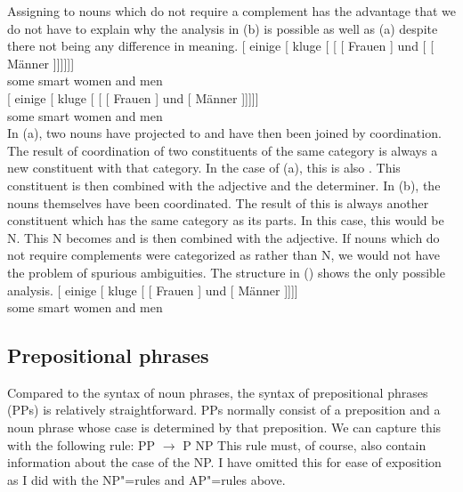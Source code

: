 Assigning \nbar to nouns which do not require a complement has the advantage that we do not have to explain why the analysis in (b) is possible as well
as (a) despite there not being any difference in meaning.
\eal
\ex 
\gll {}[ einige [\sub{\nbar} kluge [\sub{\nbar} [\sub{\nbar} [ Frauen ] und  [\sub{\nbar} [ Männer ]]]]]]\\
	 {}      some   {}           smart {}          {}           {}       women  {} and {} {}          men\\
\ex 
\gll {}[ einige [\sub{\nbar} kluge [\sub{\nbar} [ [ Frauen ] und [ Männer
]]]]]\\
	{}       some   {}           smart {}          {}       {}       women  {} and {} men\\
\zl
%
In (a), two nouns have projected to \nbar and have then been joined by coordination. The result of coordination
of two constituents of the same category is always a new constituent with that category. In the case of (a), this
is also \nbar. This constituent is then combined with the adjective and the determiner. In (b), the nouns themselves
have been coordinated. The result of this is always another constituent which has the same category as its parts. In this case,
this would be N. This N becomes \nbar and is then combined with the adjective. If nouns which do not require complements were
categorized as \nbar rather than N, we would not have the problem of spurious ambiguities. The
structure in () shows the only possible analysis.
\ea
\gll {}[ einige [\sub{\nbar} kluge [\sub{\nbar} [\sub{\nbar} Frauen ] und [\sub{\nbar} Männer
]]]]\\
      {}	some    {}           smart {}          {}           women  {}  and {} men\\
\z

\subsection{Prepositional phrases}
\label{Abschnitt-PP-Syntax}

Compared to the syntax of noun phrases, the syntax of prepositional phrases (PPs) is relatively straightforward. PPs normally 
consist of a preposition and a noun phrase whose case is determined by that preposition. We can capture this with the following
rule:
\ea
\label{Regel-PP-einfach}
PP $\to$ P NP
\z
This rule must, of course, also contain information about the case of the NP. I have omitted this for ease of exposition as I did
with the NP"=rules and AP"=rules above.

